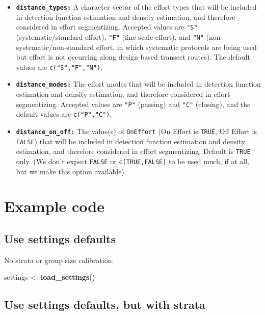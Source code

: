 \documentclass[
]{book}
\newenvironment{Shaded}{\begin{snugshade}}{\end{snugshade}}
\newcommand{\KeywordTok}[1]{\textcolor[rgb]{0.13,0.29,0.53}{\textbf{#1}}}
\newcommand{\NormalTok}[1]{#1}
\newcommand{\StringTok}[1]{\textcolor[rgb]{0.31,0.60,0.02}{#1}}
\begin{document}
\begin{itemize}
\item
  \textbf{\texttt{distance\_types:}} A character vector of the effort types that will be included in detection function estimation and density estimation, and therefore considered in effort segmentizing. Accepted values are \texttt{"S"} (systematic/standard effort), \texttt{"F"} (fine-scale effort), and \texttt{"N"} (non-systematic/non-standard effort, in which systematic protocols are being used but effort is not occurring along design-based transect routes). The default values are \texttt{c("S","F","N")}.
\item
  \textbf{\texttt{distance\_modes:}} The effort modes that will be included in detection function estimation and density estimation, and therefore considered in effort segmentizing. Accepted values are \texttt{"P"} (passing) and \texttt{"C"} (closing), and the default values are \texttt{c("P","C")}.
\item
  \textbf{\texttt{distance\_on\_off:}} The value(s) of \texttt{OnEffort} (On Effort is \texttt{TRUE}, Off Effort is \texttt{FALSE}) that will be included in detection function estimation and density estimation, and therefore considered in effort segmentizing. Default is \texttt{TRUE} only. (We don't expect \texttt{FALSE} or \texttt{c(TRUE,FALSE)} to be used much, if at all, but we make this option available).
\end{itemize}

\hypertarget{example-code}{%
\section*{Example code}\label{example-code}}

\hypertarget{use-settings-defaults}{%
\subsection*{Use settings defaults}\label{use-settings-defaults}}

No strata or group size calibration.

\begin{Shaded}
\begin{Highlighting}[]
\NormalTok{settings <-}\StringTok{ }\KeywordTok{load_settings}\NormalTok{()}
\end{Highlighting}
\end{Shaded}

\hypertarget{use-settings-defaults-but-with-strata}{%
\subsection*{Use settings defaults, but with strata}\label{use-settings-defaults-but-with-strata}}
\end{document}
